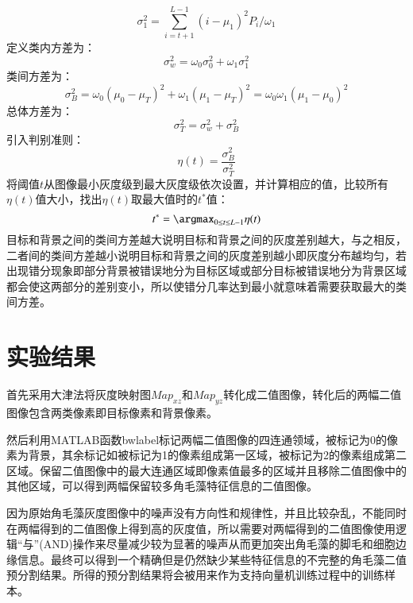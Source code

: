 \begin{equation}
\sigma_{1}^{2}=\sum_{i=t+1}^{L-1}(i-\mu_{1})^2P_{i}/\omega_{1}
\end{equation}
定义类内方差为：
\begin{equation}
\sigma_{w}^{2}=\omega_{0}\sigma_{0}^{2}+\omega_{1}\sigma_{1}^2
\end{equation}
类间方差为：
\begin{equation}
\sigma_{B}^{2}=\omega_{0}(\mu_{0}-\mu_{T})^{2}+\omega_{1}(\mu_{1}-\mu_{T})^{2}=\omega_{0}\omega_{1}(\mu_{1}-\mu_{0})^{2}
\end{equation}
总体方差为：
\begin{equation}
\sigma_{T}^{2}=\sigma_{w}^{2}+\sigma_{B}^2
\end{equation}
引入判别准则：
\begin{equation}
\eta(t)=\frac{\sigma_{B}^{2}}{\sigma_{T}^{2}}
\end{equation}
将阈值$t$从图像最小灰度级到最大灰度级依次设置，并计算相应的值，比较所有$\eta(t)$值大小，找出$\eta(t)$取最大值时的$t^{*}值$：
\begin{equation}
t^{*}=\argmax_{0\le t\le L-1}\eta(t)
\end{equation}
目标和背景之间的类间方差越大说明目标和背景之间的灰度差别越大，与之相反，二者间的类间方差越小说明目标和背景之间的灰度差别越小即灰度分布越均匀，若出现错分现象即部分背景被错误地分为目标区域或部分目标被错误地分为背景区域都会使这两部分的差别变小，所以使错分几率达到最小就意味着需要获取最大的类间方差。


\section{实验结果}
首先采用大津法将灰度映射图$Map_{xz}$和$Map_{yz}$转化成二值图像，转化后的两幅二值图像包含两类像素即目标像素和背景像素。

然后利用MATLAB函数bwlabel标记两幅二值图像的四连通领域，被标记为0的像素为背景，其余标记如被标记为1的像素组成第一区域，被标记为2的像素组成第二区域。保留二值图像中的最大连通区域即像素值最多的区域并且移除二值图像中的其他区域，可以得到两幅保留较多角毛藻特征信息的二值图像。

因为原始角毛藻灰度图像中的噪声没有方向性和规律性，并且比较杂乱，不能同时在两幅得到的二值图像上得到高的灰度值，所以需要对两幅得到的二值图像使用逻辑“与”(AND)操作来尽量减少较为显著的噪声从而更加突出角毛藻的脚毛和细胞边缘信息。最终可以得到一个精确但是仍然缺少某些特征信息的不完整的角毛藻二值预分割结果。所得的预分割结果将会被用来作为支持向量机训练过程中的训练样本。

